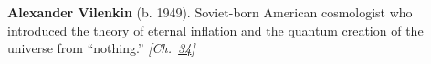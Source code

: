 \textbf{Alexander Vilenkin} (b. 1949). Soviet-born American cosmologist who introduced the theory of eternal inflation and the quantum creation of the universe from ``nothing.'' \emph{[Ch.~\hyperref[ch:boltzmannbrain]{34}]}

